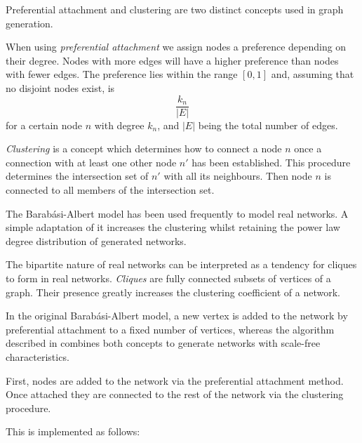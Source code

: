 \documentclass[a4paper,11pt,titlepage]{article}
\begin{document}
Preferential attachment and clustering are two distinct concepts used
in graph generation.

When using \emph{preferential attachment} we assign nodes a preference
depending on their degree. Nodes with more edges will have a higher
preference than nodes with fewer edges. The preference lies within the
range $[0,1]$ and, assuming that no disjoint nodes exist, is
\[ \frac{k_n}{|E|} \]
for a certain node $n$ with degree $k_n$,
and $|E|$ being the total number of edges.

\emph{Clustering} is a concept which determines how to connect a
node $n$ once a connection with at least one other node $n'$ has
been established. This procedure determines the intersection set
of $n'$ with all its neighbours. Then node $n$ is connected to
all members of the intersection set.

The Barab\'{a}si-Albert model has been used frequently to model real
networks. A simple adaptation of it increases the clustering whilst
retaining the power law degree distribution of generated networks.


The bipartite nature of real networks can be interpreted as a
tendency for cliques to form in real networks. \emph{Cliques} are
fully connected subsets of vertices of a graph. Their presence
greatly increases the clustering coefficient of a network.

In the original Barab\'{a}si-Albert model, a new vertex is added to
the network by preferential attachment to a fixed number of
vertices, whereas the algorithm described in \cite{oconn11} combines
both concepts to generate networks with scale-free characteristics.

First, nodes are added to the network via the preferential attachment
method. Once attached they are connected to the rest of the
network via the clustering procedure.

This is implemented as follows:
\end{document}
